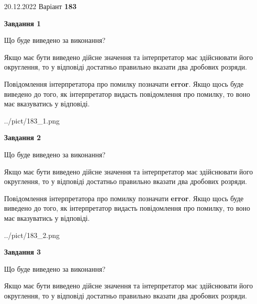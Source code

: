 \documentclass[12pt, ukrainian]{article}
\begin{document}
{20.12.2022 Варіант \No \textbf { 183 }\par}
{
\begin {Large}

{\begin {center}\textbf{Завдання 1}\end {center}}\par
Що буде виведено за виконання? \par

Якщо має бути виведено дійсне значення та інтерпретатор має здійснювати його округлення, 
то у відповіді достатньо правильно вказати два дробових розряди.

Повідомлення інтерпретатора про помилку позначати \textbf{error}.
Якщо щось буде виведено до того, як інтерпретатор видасть повідомлення про помилку, 
то воно має вказуватись у відповіді. \par

\begin{center}
	{../pict/183_1.png}
\end{center}
\newpage

{\begin {center}\textbf{Завдання 2}\end {center}}\par
Що буде виведено за виконання? \par

Якщо має бути виведено дійсне значення та інтерпретатор має здійснювати його округлення, 
то у відповіді достатньо правильно вказати два дробових розряди.

Повідомлення інтерпретатора про помилку позначати \textbf{error}.
Якщо щось буде виведено до того, як інтерпретатор видасть повідомлення про помилку, 
то воно має вказуватись у відповіді. \par

\begin{center}
	{../pict/183_2.png}
\end{center}
\newpage

{\begin {center}\textbf{Завдання 3}\end {center}}\par
Що буде виведено за виконання? \par

Якщо має бути виведено дійсне значення та інтерпретатор має здійснювати його округлення, 
то у відповіді достатньо правильно вказати два дробових розряди.


\end{Large}}
\end{document}
